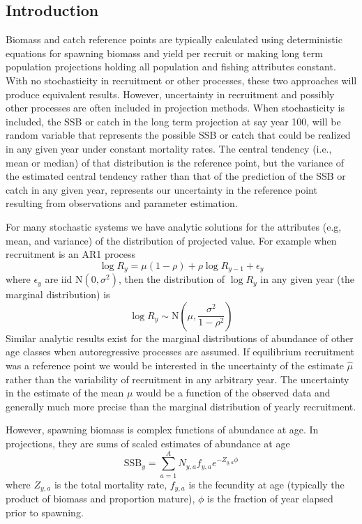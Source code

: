 \documentclass[
]{article}
\begin{document}
\hypertarget{introduction}{%
\subsection*{Introduction}\label{introduction}}

Biomass and catch reference points are typically calculated using deterministic equations for spawning biomass and yield per recruit or making long term population projections holding all population and fishing attributes constant. With no stochasticity in recruitment or other processes, these two approaches will produce equivalent results. However, uncertainty in recruitment and possibly other processes are often included in projection methods. When stochasticity is included, the SSB or catch in the long term projection at say year 100, will be random variable that represents the possible SSB or catch that could be realized in any given year under constant mortality rates. The central tendency (i.e., mean or median) of that distribution is the reference point, but the variance of the estimated central tendency rather than that of the prediction of the SSB or catch in any given year, represents our uncertainty in the reference point resulting from observations and parameter estimation.

For many stochastic systems we have analytic solutions for the attributes (e.g, mean, and variance) of the distribution of projected value. For example when recruitment is an AR1 process
\[
\log R_y = \mu(1-\rho) + \rho \log R_{y-1} + \epsilon_y
\]
where \(\epsilon_y\) are iid \(\text{N}(0,\sigma^2)\), then the distribution of \(\log R_y\) in any given year (the marginal distribution) is
\[
\log R_y \sim \text{N}\left(\mu, \frac{\sigma^2}{1-\rho^2}\right)
\]
Similar analytic results exist for the marginal distributions of abundance of other age classes when autoregressive processes are assumed. If equilibrium recruitment was a reference point we would be interested in the uncertainty of the estimate \(\hat \mu\) rather than the variability of recruitment in any arbitrary year. The uncertainty in the estimate of the mean \(\mu\) would be a function of the observed data and generally much more precise than the marginal distribution of yearly recruitment.

However, spawning biomass is complex functions of abundance at age. In projections, they are sums of scaled estimates of abundance at age
\[
\text{SSB}_y = \sum^A_{a=1} N_{y,a} f_{y,a} e^{-Z_{y,a} \phi}
\]
where \(Z_{y,a}\) is the total mortality rate, \(f_{y,a}\) is the fecundity at age (typically the product of biomass and proportion mature), \(\phi\) is the fraction of year elapsed prior to spawning.
\end{document}

